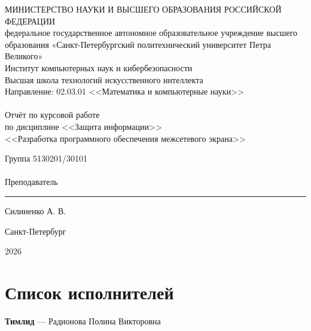 \documentclass[13pt,a4paper,final]{article}
\begin{document}
	
	\begin{center}
		\normalsize{МИНИСТЕРСТВО НАУКИ И ВЫСШЕГО ОБРАЗОВАНИЯ РОССИЙСКОЙ ФЕДЕРАЦИИ\\
			федеральное государственное автономное образовательное учреждение высшего образования «Санкт-Петербургский политехнический университет Петра Великого»\\[10pt]}
		\normalsize{Институт компьютерных наук и кибербезопасности}\\[10pt]
		\normalsize{Высшая школа технологий искусственного интеллекта}\\[10pt]
		\normalsize{Направление: 02.03.01 <<Математика и компьютерные науки>>}\\
		
		\hfill \break
		\hfill \break
		\hfill \break
		\hfill \break
		\hfill \break
		\hfill \break
		\normalsize{}\\
		\large{Отчёт по курсовой работе}\\
		\normalsize{по дисциплине <<Защита информации>>}\\
		\large{<<Разработка программного обеспечения межсетевого экрана>>}\\
		\hfill \break
		\hfill \break
		\hfill \break
		\hfill \break
		\hfill \break
		\hfill \break
	\end{center}
	
	\hspace{-0.8cm}Группа \hspace{\fill}  \hspace{3cm}\hspace{5pt} 5130201/30101\\\\
	
	\hspace{-0.8cm}Преподаватель
	
	\hfill\hspace{80pt} \rule[0.25ex]{3cm}{0.4pt} \hspace{5pt} Силиненко А. В. \hspace{-6.8cm}
	\hfill \break
	\hfill \break
	\hfill \break
	
	\hfill \break
	\hfill \break
	\hfill \break
	\hfill \break
	\hfill \break
	\hfill \break
	\begin{center} \small{Санкт-Петербург}
	\end{center}
	\begin{center} \small{2026}
	\end{center}
	\thispagestyle{empty}
	
	\newpage
	\section*{Список исполнителей}
	\textbf{Тимлид} — Радионова Полина Викторовна
	
\end{document}
